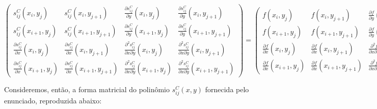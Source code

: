 \documentclass[11pt]{article}
\begin{document}
  \hspace*{-2.9cm}
  {\footnotesize
    $\begin{pmatrix}
      s_{ij}^C(x_i, y_j)  & s_{ij}^C(x_i, y_{j + 1})             & \frac{\partial s_{ij}^C}{\partial y}(x_i, y_j) & \frac{\partial s_{ij}^C}{\partial y}(x_i, y_{j + 1}) \\
      s_{ij}^C(x_{i + 1}, y_j)  & s_{ij}^C(x_{i + 1}, y_{j + 1}) & \frac{\partial s_{ij}^C}{\partial y}(x_{i + 1}, y_j) & \frac{\partial s_{ij}^C}{\partial y}(x_{i + 1}, y_{j + 1}) \\
      \frac{\partial s_{ij}^C}{\partial x}(x_i, y_j) & \frac{\partial s_{ij}^C}{\partial x}(x_i, y_{j + 1}) & \frac{\partial^2 s_{ij}^C}{\partial x \partial y}(x_i, y_j) & \frac{\partial^2 s_{ij}^C}{\partial x \partial y}(x_i, y_{j + 1}) \\
      \frac{\partial s_{ij}^C}{\partial x}(x_{i + 1}, y_j)  & \frac{\partial s_{ij}^C}{\partial x}(x_{i + 1}, y_{j + 1}) & \frac{\partial^2 s_{ij}^C}{\partial x \partial y}(x_{i + 1}, y_j) & \frac{\partial^2 s_{ij}^C}{\partial x \partial y}(x_{i + 1}, y_{j + 1})
    \end{pmatrix} =
    \begin{pmatrix}
      f(x_i, y_j)                                   & f(x_i, y_{j + 1})                                   & \frac{\partial f}{\partial y}(x_i, y_j)                    & \frac{\partial f}{\partial y}(x_i, y_{j + 1}) \\
      f(x_{i + 1}, y_j)                             & f(x_{i + 1}, y_{j + 1})                             & \frac{\partial f}{\partial y}(x_{i + 1}, y_j)              & \frac{\partial f}{\partial y}(x_{i + 1}, y_{j + 1}) \\
      \frac{\partial f}{\partial x}(x_i, y_j)       & \frac{\partial f}{\partial x}(x_i, y_{j + 1})       & \frac{\partial^2 f}{\partial x \partial y}(x_i, y_j)       & \frac{\partial^2 f}{\partial x \partial y}(x_i, y_{j + 1}) \\
      \frac{\partial f}{\partial x}(x_{i + 1}, y_j) & \frac{\partial f}{\partial x}(x_{i + 1}, y_{j + 1}) & \frac{\partial^2 f}{\partial x \partial y}(x_{i + 1}, y_j) & \frac{\partial^2 f}{\partial x \partial y}(x_{i + 1}, y_{j + 1})
    \end{pmatrix}$}
    \newline

  Consideremos, então, a forma matricial do polinômio $s_{ij}^C(x, y)$ fornecida pelo enunciado, reproduzida abaixo:
\end{document}
